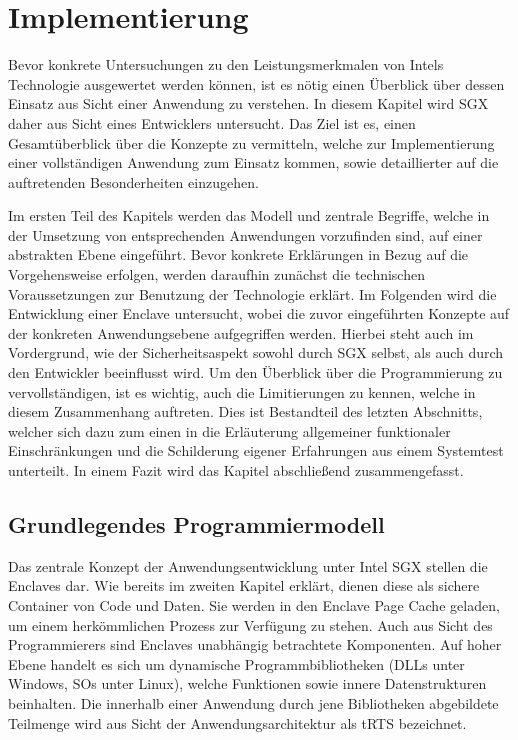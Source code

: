 
\chapter{Implementierung}

Bevor konkrete Untersuchungen zu den Leistungsmerkmalen von Intels Technologie ausgewertet werden können, ist es nötig einen Überblick über dessen Einsatz aus Sicht einer Anwendung zu verstehen. In diesem Kapitel wird \ac{SGX} daher aus Sicht eines Entwicklers untersucht. Das Ziel ist es, einen Gesamtüberblick über die Konzepte zu vermitteln, welche zur Implementierung einer vollständigen Anwendung zum Einsatz kommen, sowie detaillierter auf die auftretenden Besonderheiten einzugehen.

Im ersten Teil des Kapitels werden das Modell und zentrale Begriffe, welche in der Umsetzung von entsprechenden Anwendungen vorzufinden sind, auf einer abstrakten Ebene eingeführt. Bevor konkrete Erklärungen in Bezug auf die Vorgehensweise erfolgen, werden daraufhin zunächst die technischen Voraussetzungen zur Benutzung der Technologie erklärt. Im Folgenden wird die Entwicklung einer Enclave untersucht, wobei die zuvor eingeführten Konzepte auf der konkreten Anwendungsebene aufgegriffen werden. Hierbei steht auch im Vordergrund, wie der Sicherheitsaspekt sowohl durch \ac{SGX} selbst, als auch durch den Entwickler beeinflusst wird. Um den Überblick über die Programmierung zu vervollständigen, ist es wichtig, auch die Limitierungen zu kennen, welche in diesem Zusammenhang auftreten. Dies ist Bestandteil des letzten Abschnitts, welcher sich dazu zum einen in die Erläuterung allgemeiner funktionaler Einschränkungen und die Schilderung eigener Erfahrungen aus einem Systemtest unterteilt. In einem Fazit wird das Kapitel abschließend zusammengefasst.

\section{Grundlegendes Programmiermodell}

Das zentrale Konzept der Anwendungsentwicklung unter Intel \ac{SGX} stellen die Enclaves dar. Wie bereits im zweiten Kapitel erklärt, dienen diese als sichere Container von Code und Daten. Sie werden in den Enclave Page Cache geladen, um einem herkömmlichen Prozess zur Verfügung zu stehen. Auch aus Sicht des Programmierers sind Enclaves unabhängig betrachtete Komponenten. Auf hoher Ebene handelt es sich um dynamische Programmbibliotheken (\acp{DLL} unter Windows,  \acp{SO} unter Linux), welche Funktionen sowie innere Datenstrukturen beinhalten. Die innerhalb einer Anwendung durch jene Bibliotheken abgebildete Teilmenge wird aus Sicht der Anwendungsarchitektur als \ac{tRTS} bezeichnet.

